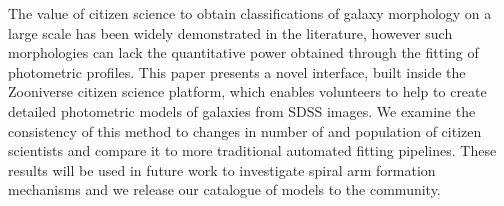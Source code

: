\documentclass[../main.tex]{subfiles}
\begin{document}
The value of citizen science to obtain classifications of galaxy morphology on a large scale has been widely demonstrated in the literature, however such morphologies can lack the quantitative power obtained through the fitting of photometric profiles. This paper presents a novel interface, built inside the Zooniverse citizen science platform, which enables volunteers to help to create detailed photometric models of galaxies from SDSS images. We examine the consistency of this method to changes in number of and population of citizen scientists and compare it to more traditional automated fitting pipelines. These results will be used in future work to investigate spiral arm formation mechanisms and we release our catalogue of models to the community.
\end{document}
